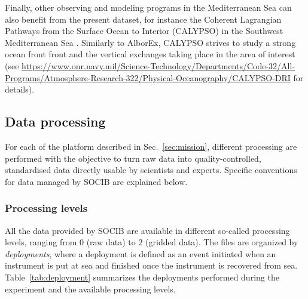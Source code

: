 \documentclass[essd,manuscript]{copernicus}
\begin{document}
Finally, other observing and modeling programs in the Mediterranean Sea can also benefit from the present dataset, for instance the Coherent Lagrangian Pathways from the Surface Ocean to Interior (CALYPSO) in the Southwest Mediterranean Sea \citep{JOHNSTON2018}. Similarly to AlborEx, CALYPSO strives to study a strong ocean front front and the vertical exchanges taking place in the area of interest (see \url{https://www.onr.navy.mil/Science-Technology/Departments/Code-32/All-Programs/Atmosphere-Research-322/Physical-Oceanography/CALYPSO-DRI} for details).

\subsection{Data processing\label{sec:processing}}

For each of the platform described in Sec.~\ref{sec:mission}, different processing are performed with the objective to turn raw data into quality-controlled, standardised data directly usable by scientists and experts. Specific conventions for data managed by SOCIB are explained below.

\subsubsection{Processing levels}

All the data provided by SOCIB are available in different so-called processing levels, ranging from 0 (raw data) to 2 (gridded data). The files are organized by \textit{deployments}, where a deployment is defined as an event initiated when an instrument is put at sea and finished once the instrument is recovered from sea. Table~\ref{tab:deployment} summarizes the deployments performed during the experiment and the available processing levels.
\end{document}
